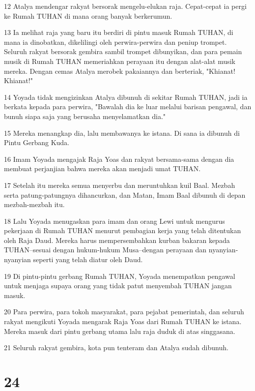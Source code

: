 \par 12 Atalya mendengar rakyat bersorak mengelu-elukan raja. Cepat-cepat ia pergi ke Rumah TUHAN di mana orang banyak berkerumun.
\par 13 Ia melihat raja yang baru itu berdiri di pintu masuk Rumah TUHAN, di mana ia dinobatkan, dikelilingi oleh perwira-perwira dan peniup trompet. Seluruh rakyat bersorak gembira sambil trompet dibunyikan, dan para pemain musik di Rumah TUHAN memeriahkan perayaan itu dengan alat-alat musik mereka. Dengan cemas Atalya merobek pakaiannya dan berteriak, "Khianat! Khianat!"
\par 14 Yoyada tidak mengizinkan Atalya dibunuh di sekitar Rumah TUHAN, jadi ia berkata kepada para perwira, "Bawalah dia ke luar melalui barisan pengawal, dan bunuh siapa saja yang berusaha menyelamatkan dia."
\par 15 Mereka menangkap dia, lalu membawanya ke istana. Di sana ia dibunuh di Pintu Gerbang Kuda.
\par 16 Imam Yoyada mengajak Raja Yoas dan rakyat bersama-sama dengan dia membuat perjanjian bahwa mereka akan menjadi umat TUHAN.
\par 17 Setelah itu mereka semua menyerbu dan meruntuhkan kuil Baal. Mezbah serta patung-patungnya dihancurkan, dan Matan, Imam Baal dibunuh di depan mezbah-mezbah itu.
\par 18 Lalu Yoyada menugaskan para imam dan orang Lewi untuk mengurus pekerjaan di Rumah TUHAN menurut pembagian kerja yang telah ditentukan oleh Raja Daud. Mereka harus mempersembahkan kurban bakaran kepada TUHAN--sesuai dengan hukum-hukum Musa--dengan perayaan dan nyanyian-nyanyian seperti yang telah diatur oleh Daud.
\par 19 Di pintu-pintu gerbang Rumah TUHAN, Yoyada menempatkan pengawal untuk menjaga supaya orang yang tidak patut menyembah TUHAN jangan masuk.
\par 20 Para perwira, para tokoh masyarakat, para pejabat pemerintah, dan seluruh rakyat mengikuti Yoyada mengarak Raja Yoas dari Rumah TUHAN ke istana. Mereka masuk dari pintu gerbang utama lalu raja duduk di atas singgasana.
\par 21 Seluruh rakyat gembira, kota pun tenteram dan Atalya sudah dibunuh.

\chapter{24}

